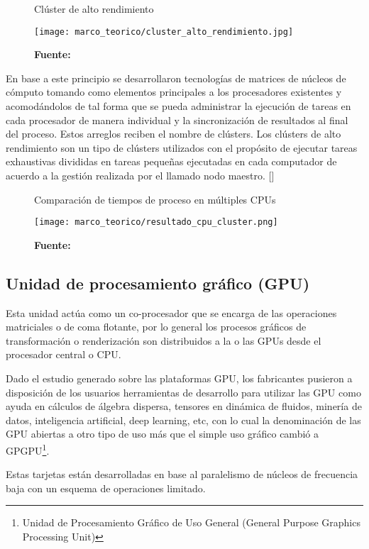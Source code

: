 \documentclass[../main/main.tex]{subfiles}
\begin{document}
  \begin{figure}[H]
    \centering
    \caption{Clúster de alto rendimiento}
    \texttt{[image: marco\_teorico/cluster\_alto\_rendimiento.jpg]}
    \caption*{\textbf{Fuente:} \cite[p.~2]{article:cluster_alto_rendimiento}}
  \end{figure}

  En base a este principio se desarrollaron tecnologías de matrices de núcleos de cómputo tomando como elementos principales a los procesadores existentes y acomodándolos de tal forma que se pueda administrar la ejecución de tareas en cada procesador de manera individual y la sincronización de resultados al final del proceso. Estos arreglos reciben el nombre de clústers. Los clústers de alto rendimiento son un tipo de clústers utilizados con el propósito de ejecutar tareas exhaustivas divididas en tareas pequeñas ejecutadas en cada computador de acuerdo a la gestión realizada por el llamado nodo maestro. [\cite{article:cluster_alto_rendimiento}]

  \begin{figure}[H]
    \centering
    \caption{Comparación de tiempos de proceso en múltiples CPUs}
    \texttt{[image: marco\_teorico/resultado\_cpu\_cluster.png]}
    \caption*{\textbf{Fuente:} \cite[p.~7]{article:cluster_alto_rendimiento}}
  \end{figure}

  \subsection{Unidad de procesamiento gráfico (GPU)}

  Esta unidad actúa como un co-procesador que se encarga de las operaciones matriciales o de coma flotante, por lo general los procesos gráficos de transformación o renderización son distribuidos a la o las GPUs desde el procesador central o CPU.

  Dado el estudio generado sobre las plataformas GPU, los fabricantes pusieron a disposición de los usuarios herramientas de desarrollo para utilizar las GPU como ayuda en cálculos de álgebra dispersa, tensores en dinámica de fluidos, minería de datos, inteligencia artificial, deep learning, etc, con lo cual la denominación de las GPU abiertas a otro tipo de uso más que el simple uso gráfico cambió a GPGPU\footnote{Unidad de Procesamiento Gráfico de Uso General (General Purpose Graphics Processing Unit)}.

  Estas tarjetas están desarrolladas en base al paralelismo de núcleos de frecuencia baja con un esquema de operaciones limitado.
\end{document}
